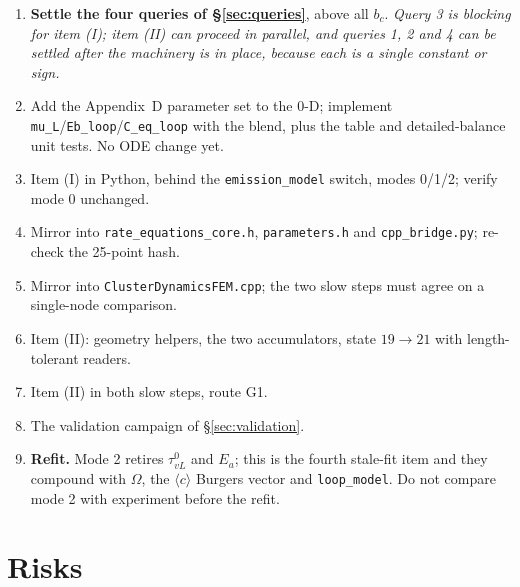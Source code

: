 \documentclass[11pt]{article}
\newcommand{\cloop}{\ensuremath{\langle c\rangle}}
\newcommand{\fbk}{\discretionary{}{}{}}   %
\newcommand{\file}[1]{\texttt{\small #1}}
\begin{document}
\begin{enumerate}
\item \textbf{Settle the four queries of \S\ref{sec:queries}}, above all
  $b_c$.  \emph{Query 3 is blocking for item (I); item (II) can proceed in
  parallel, and queries 1, 2 and 4 can be settled after the machinery is in
  place, because each is a single constant or sign.}
\item Add the Appendix~D parameter set to the 0-D; implement
  \verb|mu_L|/\verb|Eb_loop|/\verb|C_eq_loop| with the blend, plus the table
  and detailed-balance unit tests.  No ODE change yet.
\item Item (I) in Python, behind the \verb|emission_model| switch, modes
  0/1/2; verify mode 0 unchanged.
\item Mirror into \file{rate\_\fbk equations\_\fbk core.\fbk h},
  \file{parameters.\fbk h} and \file{cpp\_\fbk bridge.\fbk py}; re-check the
  25-point hash.
\item Mirror into \file{ClusterDynamicsFEM.\fbk cpp}; the two slow steps must
  agree on a single-node comparison.
\item Item (II): geometry helpers, the two accumulators, state $19\to21$ with
  length-tolerant readers.
\item Item (II) in both slow steps, route G1.
\item The validation campaign of \S\ref{sec:validation}.
\item \textbf{Refit.}  Mode 2 retires $\tau_{vL}^{0}$ and $E_a$; this is the
  fourth stale-fit item and they compound with $\Omega$, the \cloop{} Burgers
  vector and \verb|loop_model|.  Do not compare mode 2 with experiment before
  the refit.
\end{enumerate}

\section{Risks}
\end{document}
